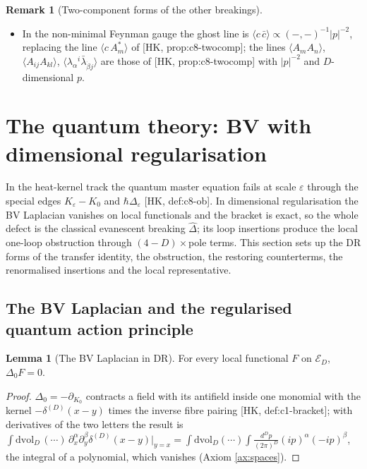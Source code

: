 \documentclass[11pt]{article}
\theoremstyle{definition}
\newtheorem{lemma}[definition]{Lemma}
\newtheorem{remark}[definition]{Remark}
\numberwithin{equation}{section}
\begin{document}
\begin{remark}[Two-component forms of the other breakings]
\begin{itemize}
\item In the non-minimal Feynman gauge the ghost line is $\langle c\,\bar c\rangle\propto(-,-)^{-1}|p|^{-2}$, replacing the line $\langle c\,A^*_m\rangle$ of [HK, prop:c8-twocomp]; the lines $\langle A_mA_n\rangle$, $\langle A_{ij}A_{kl}\rangle$, $\langle\lambda_\alpha{}^i\bar\lambda_{\dot\beta j}\rangle$ are those of [HK, prop:c8-twocomp] with $|p|^{-2}$ and $D$-dimensional $p$.
\end{itemize}
\end{remark}


\section{The quantum theory: BV with dimensional regularisation}
\label{sec:quantum}

In the heat-kernel track the quantum master equation fails at scale $\varepsilon$ through the special edges $K_\varepsilon-K_0$ and $\hbar\Delta_\varepsilon$ [HK, def:c8-ob]. In dimensional regularisation the BV Laplacian vanishes on local functionals and the bracket is exact, so the whole defect is the classical evanescent breaking $\widehat\Delta$; its loop insertions produce the local one-loop obstruction through $(4-D)\times$pole terms. This section sets up the DR forms of the transfer identity, the obstruction, the restoring counterterms, the renormalised insertions and the local representative.

\subsection{The BV Laplacian and the regularised quantum action principle}

\begin{lemma}[The BV Laplacian in DR]
\label{lem:lap}
For every local functional $F$ on $\mathscr E_D$, $\Delta_0F=0$.
\end{lemma}

\begin{proof}
$\Delta_0=-\partial_{K_0}$ contracts a field with its antifield inside one monomial with the kernel $-\delta^{(D)}(x-y)$ times the inverse fibre pairing [HK, def:c1-bracket]; with derivatives of the two letters the result is $\int\mathrm{dvol}_D\,(\cdots)\,\partial^\alpha_x\partial^\beta_y\delta^{(D)}(x-y)|_{y=x}=\int\mathrm{dvol}_D(\cdots)\int\frac{d^Dp}{(2\pi)^D}(ip)^\alpha(-ip)^\beta$, the integral of a polynomial, which vanishes (Axiom \ref{ax:spaces}).
\end{proof}
\end{document}
